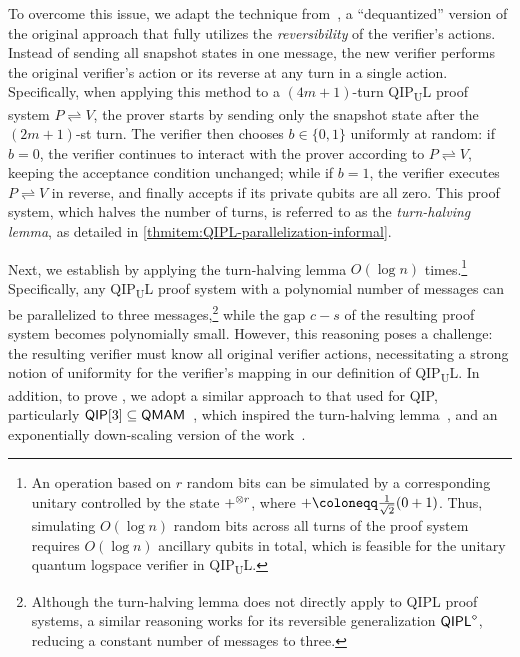 \documentclass[10pt,a4paper]{article}
\numberwithin{equation}{section}
\numberwithin{figure}{section}
\newcommand{\QIP}{\textnormal{\textsf{QIP}}\xspace}
\newcommand{\QMAM}{\textnormal{\textsf{QMAM}}\xspace}
\newcommand{\QIPL}{\textnormal{\textsf{QIPL}}\xspace}
\newcommand{\QIPUL}{\texorpdfstring{\textnormal{\textsf{QIP}\textsubscript{\textnormal{U}}\textsf{L}}}\xspace}
\newcommand{\protocol}[2]{{#1}\!\rightleftharpoons\!{#2}}
\let\ket\relax\DeclarePairedDelimiter\ket{\lvert}{\rangle}
\newcommand{\binset}{\{0,1\}}
\begin{document}
To overcome this issue, we adapt the technique from~\cite[Section 4]{KKMV09}, a ``dequantized'' version of the original approach that fully utilizes the \textit{reversibility} of the verifier's actions. Instead of sending all snapshot states in one message, the new verifier performs the original verifier's action or its reverse at any turn in a single action. Specifically, when applying this method to a $(4m+1)$-turn \QIPUL{} proof system $\protocol{P}{V}$, the prover starts by sending only the snapshot state after the $(2m+1)$-st turn. The verifier then chooses $b\in\binset$ uniformly at random: if $b=0$, the verifier continues to interact with the prover according to $\protocol{P}{V}$, keeping the acceptance condition unchanged; while if $b=1$, the verifier executes $\protocol{P}{V}$ in reverse, and finally accepts if its private qubits are all zero.
This proof system, which halves the number of turns, is referred to as the \textit{turn-halving lemma}, as detailed in \ref{thmitem:QIPL-parallelization-informal}.

Next, we establish  by applying the turn-halving lemma $O(\log n)$ times.\footnote{An operation based on $r$ random bits can be simulated by a corresponding unitary controlled by the state $\ket{+}^{\otimes r}$, where $\ket{+} \coloneqq \frac{1}{\sqrt{2}}(\ket{0}+\ket{1})$. Thus, simulating $O(\log n)$ random bits across all turns of the proof system requires $O(\log n)$ ancillary qubits in total, which is feasible for the unitary quantum logspace verifier in \QIPUL{}.\label{footref:simulating-random-bits}} Specifically, any \QIPUL{} proof system with a polynomial number of messages can be parallelized to three messages,\footnote{Although the turn-halving lemma does not directly apply to \QIPL{} proof systems, a similar reasoning works for its reversible generalization $\QIPL^{\diamond}$, reducing a constant number of messages to three.} while the gap $c-s$ of the resulting proof system becomes polynomially small. 
However, this reasoning poses a challenge: the resulting verifier must know all original verifier actions, necessitating a strong notion of uniformity for the verifier's mapping in our definition of \QIPUL{}. 
In addition, to prove , we adopt a similar approach to that used for \QIP{}, particularly $\QIP[3] \subseteq \QMAM{}$~\cite{MW05}, which inspired the turn-halving lemma~\cite[Section 4]{KKMV09}, and an exponentially down-scaling version of the work~\cite{JJUW11}. 
\end{document}
